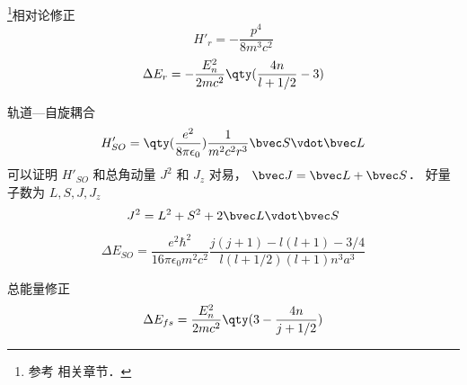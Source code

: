 
\begin{issues}
\issueDraft
\end{issues}

\footnote{参考 \cite{GriffQ} 相关章节．}相对论修正
\begin{equation}
H'_r = -\frac{p^4}{8m^3 c^2}
\end{equation}
\begin{equation}
\Delta E_r = -\frac{E_n^2}{2mc^2} \qty(\frac{4n}{l+1/2}-3)
\end{equation}

轨道—自旋耦合
\begin{equation}
H'_{SO} = \qty(\frac{e^2}{8\pi\epsilon_0}) \frac{1}{m^2c^2 r^3} \bvec S \vdot \bvec L
\end{equation}
可以证明 $H'_{SO}$ 和总角动量 $J^2$ 和 $J_z$ 对易， $\bvec J = \bvec L + \bvec S$． 好量子数为 $L, S, J, J_z$
\begin{equation}
J^2 = L^2 + S^2 + 2\bvec L \vdot \bvec S
\end{equation}

\begin{equation}
\Delta E_{SO} = \frac{e^2\hbar^2}{16\pi\epsilon_0 m^2 c^2} \frac{j(j+1) - l(l+1) - 3/4}{l(l+1/2)(l+1)n^3 a^3}
\end{equation}

总能量修正
\begin{equation}
\Delta E_{fs} = \frac{E_n^2}{2mc^2}\qty(3 - \frac{4n}{j + 1/2})
\end{equation}

